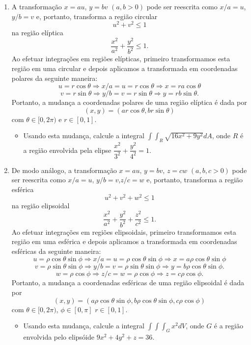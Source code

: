 \documentclass[a4paper,5pt]{amsbook}
\numberwithin{equation}{chapter}
\begin{document}
 
\begin{enumerate}
\item A transforma\c{c}\~ao $x=au$, $y=bv$ $(a,b>0)$ pode ser reescrita como $x/a=u$, $y/b=v$ e, portanto, transforma a regi\~ao circular $$u^2+v^2\leq1$$ na regi\~ao el\'iptica $$ \dfrac{x^2}{a^2}+\dfrac{y^2}{b^2}\leq 1. $$ Ao efetuar integra\c{c}\~oes em regi\~oes el\'ipticas, primeiro transformamos esta regi\~ao em uma circular e depois aplicamos a transformada em coordenadas polares da seguinte maneira:
$$u=r\cos\theta\Rightarrow x/a=u=r\cos\theta\Rightarrow x=ra\cos\theta$$
$$v=r\sin\theta\Rightarrow y/b=v=r\sin\theta\Rightarrow y=rb\sin\theta.$$
Portanto, a mudan\c{c}a a coordenadas polares de uma regi\~ao el\'iptica \'e dada por $$(x,y)=(ar\cos\theta,br\sin\theta)$$ com $\theta\in [0,2\pi)$ e $r\in [0,1]$. 
\begin{itemize}
 \item Usando esta mudan\c{c}a, calcule a integral $\int\int_R \sqrt{16x^2+9y^2}dA $, onde $R$ \'e a regi\~ao envolvida pela elipse $ \dfrac{x^2}{3^2}+\dfrac{y^2}{4^2}= 1.$\\
\end{itemize}


\item De modo an\'alogo, a transforma\c{c}\~ao $x=au$, $y=bv$, $z=cw$ $(a,b,c>0)$ pode ser reescrita como $x/a=u$, $y/b=v$,$z/c=w$ e, portanto, transforma a regi\~ao esf\'erica $$u^2+v^2+w^2\leq1$$ na regi\~ao elipsoidal $$ \dfrac{x^2}{a^2}+\dfrac{y^2}{b^2}+\dfrac{z^2}{c^2}\leq 1. $$ Ao efetuar integra\c{c}\~oes em regi\~oes elipsoidais, primeiro transformamos esta regi\~ao em uma esf\'erica e depois aplicamos a transformada em coordenadas esf\'ericas da seguinte maneira:
$$u=\rho\cos\theta\sin\phi\Rightarrow x/a=u=\rho\cos\theta\sin\phi\Rightarrow x=a\rho \cos\theta\sin\phi$$
$$v=\rho\sin\theta\sin\phi\Rightarrow y/b=v=\rho\sin\theta\sin\phi\Rightarrow y=b\rho \cos\theta\sin\phi.$$
$$w=\rho\cos\phi\Rightarrow z/c=w=\rho\cos\phi\Rightarrow z= c\rho \cos\phi.$$
Portanto, a mudan\c{c}a a coordenadas esf\'ericas de uma regi\~ao elipsoidal \'e dada por $$(x,y)=(a\rho \cos\theta\sin\phi,b\rho \cos\theta\sin\phi,c\rho \cos\phi)$$ com $\theta\in [0,2\pi)$, $\phi \in [0,\pi]$ $r\in [0,1]$. 
\begin{itemize}
 \item Usando esta mudan\c{c}a, calcule a integral $\int\int\int_G x^2 dV $, onde $G$ \'e a regi\~ao envolvida pelo elips\'oide $ 9x^2+4y^2+z=36.$\\
\end{itemize}


\end{enumerate}
\end{document}

